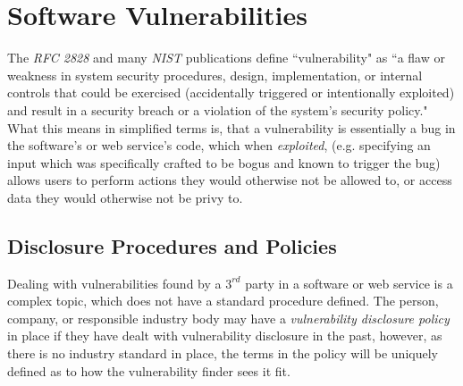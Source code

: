 \documentclass[a4paper,12pt]{article}
\begin{document}
\newpage
\section{Software Vulnerabilities}
	
	The \textit{RFC 2828} and many \textit{NIST} publications define ``vulnerability" as ``a flaw or weakness in system security procedures, design, implementation, or internal controls that could be exercised (accidentally triggered or intentionally exploited) and result in a security breach or a violation of the system's security policy."\cite{rfc2828,nist80030} What this means in simplified terms is, that a vulnerability is essentially a bug in the software's or web service's code, which when \textit{exploited}, (e.g. specifying an input which was specifically crafted to be bogus and known to trigger the bug) allows users to perform actions they would otherwise not be allowed to, or access data they would otherwise not be privy to.
	
\subsection{Disclosure Procedures and Policies}
	
	Dealing with vulnerabilities found by a $3^{rd}$ party in a software or web service is a complex topic, which does not have a standard procedure defined. The person, company, or responsible industry body may have a \textit{vulnerability disclosure policy} in place if they have dealt with vulnerability disclosure in the past, however, as there is no industry standard in place, the terms in the policy will be uniquely defined as to how the vulnerability finder sees it fit.
	
\end{document}
